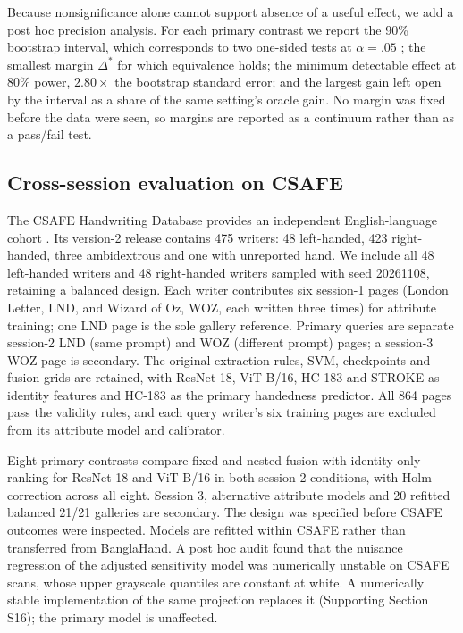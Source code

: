Because nonsignificance alone cannot support absence of a useful effect, we add a post hoc precision analysis. For each primary contrast we report the 90\% bootstrap interval, which corresponds to two one-sided tests at $\alpha=.05$ \cite{lakens2017equivalence}; the smallest margin $\Delta^*$ for which equivalence holds; the minimum detectable effect at 80\% power, $2.80\times$ the bootstrap standard error; and the largest gain left open by the interval as a share of the same setting's oracle gain. No margin was fixed before the data were seen, so margins are reported as a continuum rather than as a pass/fail test.

\subsection{Cross-session evaluation on CSAFE}
\label{sec:csafemethods}
The CSAFE Handwriting Database provides an independent English-language cohort \cite{crawford2020database,crawford2026csafe}. Its version-2 release contains 475 writers: 48 left-handed, 423 right-handed, three ambidextrous and one with unreported hand. We include all 48 left-handed writers and 48 right-handed writers sampled with seed 20261108, retaining a balanced design. Each writer contributes six session-1 pages (London Letter, LND, and Wizard of Oz, WOZ, each written three times) for attribute training; one LND page is the sole gallery reference. Primary queries are separate session-2 LND (same prompt) and WOZ (different prompt) pages; a session-3 WOZ page is secondary. The original extraction rules, SVM, checkpoints and fusion grids are retained, with ResNet-18, ViT-B/16, HC-183 and STROKE as identity features and HC-183 as the primary handedness predictor. All 864 pages pass the validity rules, and each query writer's six training pages are excluded from its attribute model and calibrator.

Eight primary contrasts compare fixed and nested fusion with identity-only ranking for ResNet-18 and ViT-B/16 in both session-2 conditions, with Holm correction across all eight. Session 3, alternative attribute models and 20 refitted balanced 21/21 galleries are secondary. The design was specified before CSAFE outcomes were inspected. Models are refitted within CSAFE rather than transferred from BanglaHand. A post hoc audit found that the nuisance regression of the adjusted sensitivity model was numerically unstable on CSAFE scans, whose upper grayscale quantiles are constant at white. A numerically stable implementation of the same projection replaces it (Supporting Section S16); the primary model is unaffected.

